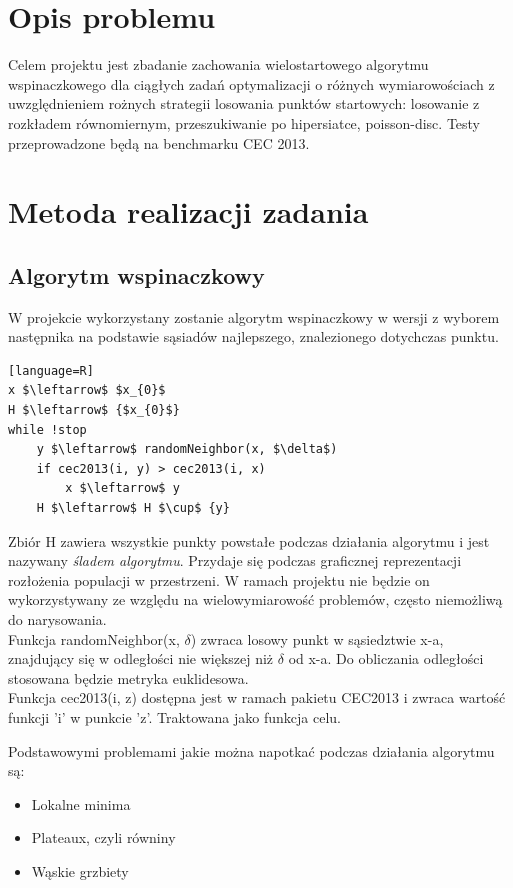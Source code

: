 \documentclass{article}
\begin{document}
\section{Opis problemu}

Celem projektu jest zbadanie zachowania wielostartowego algorytmu wspinaczkowego dla ciągłych zadań optymalizacji o różnych wymiarowościach z uwzględnieniem rożnych strategii losowania punktów startowych: losowanie z rozkładem równomiernym, przeszukiwanie po hipersiatce, poisson-disc. Testy przeprowadzone będą na benchmarku CEC 2013.

\section{Metoda realizacji zadania}

\subsection{Algorytm wspinaczkowy}

W projekcie wykorzystany zostanie algorytm wspinaczkowy w wersji z wyborem następnika na podstawie sąsiadów najlepszego, znalezionego dotychczas punktu.

\begin{lstlisting}[mathescape][language=R]
x $\leftarrow$ $x_{0}$
H $\leftarrow$ {$x_{0}$}
while !stop
	y $\leftarrow$ randomNeighbor(x, $\delta$)
	if cec2013(i, y) > cec2013(i, x)
		x $\leftarrow$ y
	H $\leftarrow$ H $\cup$ {y}
\end{lstlisting}
Zbiór H zawiera wszystkie punkty powstałe podczas działania algorytmu i jest nazywany \textit{śladem algorytmu}. Przydaje się podczas graficznej reprezentacji rozłożenia populacji w przestrzeni. W ramach projektu nie będzie on wykorzystywany ze względu na wielowymiarowość problemów, często niemożliwą do narysowania. \\
Funkcja randomNeighbor(x, $\delta$) zwraca losowy punkt w sąsiedztwie x-a, znajdujący się w odległości nie większej niż $\delta$ od x-a. Do obliczania odległości stosowana będzie metryka euklidesowa. \\
Funkcja cec2013(i, z) dostępna jest w ramach pakietu CEC2013 i zwraca wartość funkcji 'i' w punkcie 'z'. Traktowana jako funkcja celu.

Podstawowymi problemami jakie można napotkać podczas działania algorytmu są:
\begin{itemize}
	\item Lokalne minima
	\item Plateaux, czyli równiny
	\item Wąskie grzbiety
\end{itemize}
\end{document}

